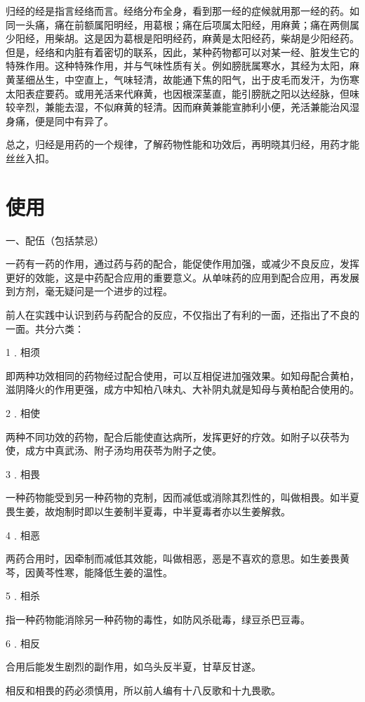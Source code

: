 \documentclass[12pt,UTF8]{ctexbook}
\begin{document}
归经的经是指言经络而言。经络分布全身，看到那一经的症候就用那一经的药。如同一头痛，痛在前额属阳明经，用葛根；痛在后项属太阳经，用麻黄；痛在两侧属少阳经，用柴胡。这是因为葛根是阳明经药，麻黄是太阳经药，柴胡是少阳经药。但是，经络和内脏有着密切的联系，因此，某种药物都可以对某一经、脏发生它的特殊作用。这种特殊作用，并与气味性质有关。例如膀胱属寒水，其经为太阳，麻黄茎细丛生，中空直上，气味轻清，故能通下焦的阳气，出于皮毛而发汗，为伤寒太阳表症要药。或用羌活来代麻黄，也因根深茎直，能引膀胱之阳以达经脉，但味较辛烈，兼能去湿，不似麻黄的轻清。因而麻黄兼能宣肺利小便，羌活兼能治风湿身痛，便是同中有异了。

总之，归经是用药的一个规律，了解药物性能和功效后，再明晓其归经，用药才能丝丝入扣。


\section{使用}

一、配伍（包括禁忌）

一药有一药的作用，通过药与药的配合，能促使作用加强，或减少不良反应，发挥更好的效能，这是中药配合应用的重要意义。从单味药的应用到配合应用，再发展到方剂，毫无疑问是一个进步的过程。

前人在实践中认识到药与药配合的反应，不仅指出了有利的一面，还指出了不良的一面。共分六类：

1﹒相须

即两种功效相同的药物经过配合使用，可以互相促进加强效果。如知母配合黄柏，滋阴降火的作用更强，成方中知柏八味丸、大补阴丸就是知母与黄柏配合使用的。

2﹒相使

两种不同功效的药物，配合后能使直达病所，发挥更好的疗效。如附子以茯苓为使，成方中真武汤、附子汤均用茯苓为附子之使。

3﹒相畏

一种药物能受到另一种药物的克制，因而减低或消除其烈性的，叫做相畏。如半夏畏生姜，故炮制时即以生姜制半夏毒，中半夏毒者亦以生姜解救。

4﹒相恶

两药合用时，因牵制而减低其效能，叫做相恶，恶是不喜欢的意思。如生姜畏黄芩，因黄芩性寒，能降低生姜的温性。

5﹒相杀

指一种药物能消除另一种药物的毒性，如防风杀砒毒，绿豆杀巴豆毒。

6﹒相反

合用后能发生剧烈的副作用，如乌头反半夏，甘草反甘遂。

相反和相畏的药必须慎用，所以前人编有十八反歌和十九畏歌。
\end{document}
